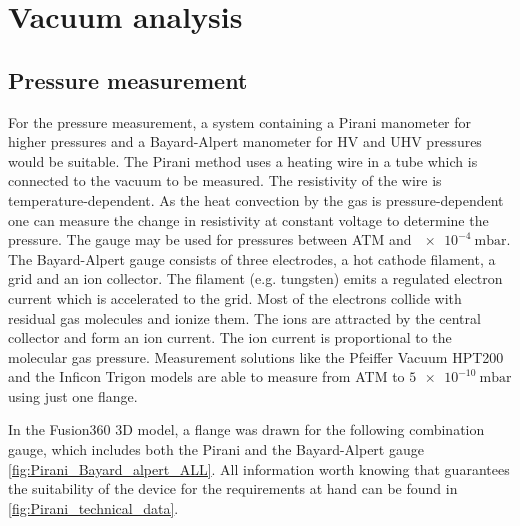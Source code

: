 \section{Vacuum analysis}

\subsection{Pressure measurement} \label{sec:pressure_measurement}

For the pressure measurement, a system containing a Pirani manometer for higher pressures and a Bayard-Alpert manometer for HV and UHV pressures would be suitable.
The Pirani method uses a heating wire in a tube which is connected to the vacuum to be measured.
The resistivity of the wire is temperature-dependent.
As the heat convection by the gas is pressure-dependent one can measure the change in resistivity at constant voltage to determine the pressure.
The gauge may be used for pressures between ATM and $\SI{e-4}{\milli\bar}$.
The Bayard-Alpert gauge consists of three electrodes, a hot cathode filament, a grid and an ion collector.
The filament (e.g. tungsten) emits a regulated electron current which is accelerated to the grid.
Most of the electrons collide with residual gas molecules and ionize them.
The ions are attracted by the central collector and form an ion current.
The ion current is proportional to the molecular gas pressure.
Measurement solutions like the Pfeiffer Vacuum HPT200 \cite{HPT200} and the Inficon Trigon models \cite{BCG450} are able to measure from ATM to $\SI{5e-10}{\milli\bar}$ using just one flange.

In the Fusion360 3D model, a flange was drawn for the following combination gauge, which includes both the Pirani and the Bayard-Alpert gauge \autoref{fig:Pirani_Bayard_alpert_ALL}.
All information worth knowing that guarantees the suitability of the device for the requirements at hand can be found in \autoref{fig:Pirani_technical_data}.

